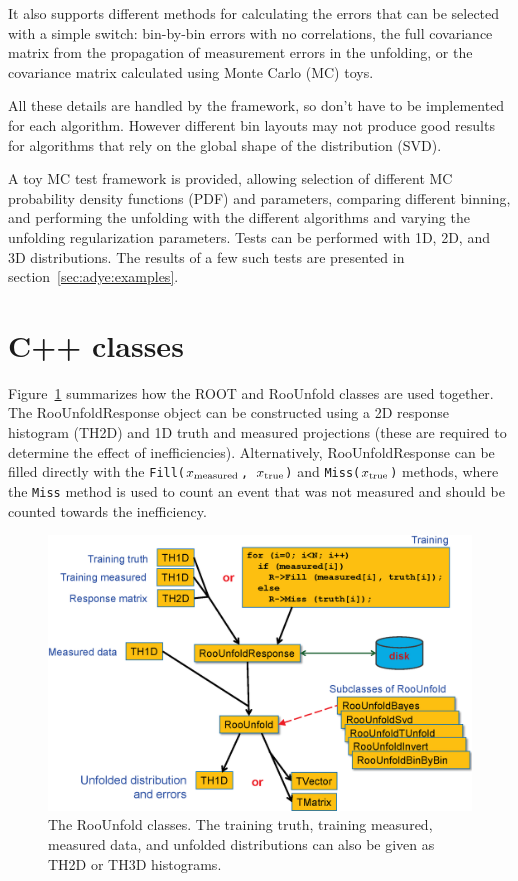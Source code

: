 \documentclass{cernrep}
\begin{document}
It also supports different methods for calculating the errors that can
be selected with a simple switch: bin-by-bin errors with no correlations,
the full covariance matrix from the propagation of measurement errors in the unfolding, or
the covariance matrix calculated using Monte Carlo (MC) toys.

All these details are handled by the framework, so don't have to be
implemented for each algorithm. However different bin layouts may not produce good results for
algorithms that rely on the global shape of the distribution (SVD).

A toy MC test framework is provided, allowing
selection of different MC probability density functions (PDF) and parameters,
comparing different binning, and performing the unfolding with the different
algorithms and varying the unfolding regularization parameters.
Tests can be performed with 1D, 2D, and 3D distributions.
The results of a few such tests are presented in section~\ref{sec:adye:examples}.



\section{C++ classes}

Figure~\ref{Fig:adye:classes} summarizes how the ROOT and RooUnfold classes are used
together. The RooUnfoldResponse object can be constructed using a 2D response histogram (TH2D)
and 1D truth and measured projections (these are required to determine the effect of inefficiencies).
Alternatively, RooUnfoldResponse can be filled directly with the
\texttt{Fill($x_{\rm measured}$, $x_{\rm true}$)}
and
\texttt{Miss($x_{\rm true}$)}
methods, where the \texttt{Miss} method is used to count an event that was not measured
and should be counted towards the inefficiency.%
\begin{figure}
\centerline{\includegraphics[width=\textwidth]{phystat2011_adye_classes.eps}}
\caption{The RooUnfold classes. The training truth, training measured, measured data, and unfolded distributions
can also be given as TH2D or TH3D histograms.}\label{Fig:adye:classes}
\end{figure}
\end{document}
